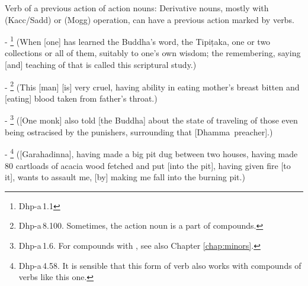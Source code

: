 \begin{compactenum}[(1)]
\item Verb of a previous action of action nouns: Derivative nouns, mostly with  (Kacc/Sadd) or  (Mogg) operation, can have a previous action marked by  verbs.\par
- \footnote{Dhp-a\,1.1} (When [one] has learned the Buddha's word, the Tipi\d taka, one or two collections or all of them, suitably to one's own wisdom; the remembering, saying [and] teaching of that is called this scriptural study.)\par
- \footnote{Dhp-a\,8.100. Sometimes, the action noun is a part of compounds.} (This [man] [is] very cruel, having ability in eating mother's breast bitten and [eating] blood taken from father's throat.)\par
- \footnote{Dhp-a\,1.6. For compounds with , see also Chapter \ref{chap:minors}.} ([One monk] also told [the Buddha] about the state of traveling of those even being ostracised by the punishers, surrounding that \mbox{[Dhamma preacher]}.)\par
- \footnote{Dhp-a\,4.58. It is sensible that this form of verb also works with compounds of  verbs like this one.} ([Garahadinna], having made a big pit dug between two houses, having made 80 cartloads of acacia wood fetched and put [into the pit], having given fire [to it], wants to assault me, [by] making me fall into the burning pit.)\par


\end{compactenum}
